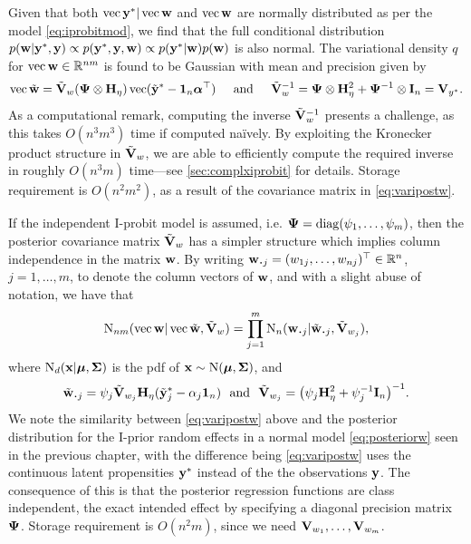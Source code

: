 Given that both $\operatorname{vec} {\mathbf y}^* | \operatorname{vec} {\mathbf w}$ and $\operatorname{vec}{\mathbf w}$ are normally distributed as per the model \cref{eq:iprobitmod}, we find that the full conditional distribution $p({\mathbf w}|{\mathbf y}^*,{\mathbf y}) \propto p({\mathbf y}^*,{\mathbf y},{\mathbf w}) \propto p({\mathbf y}^*|{\mathbf w})p({\mathbf w})$ is also normal. 
The variational density $q$ for $\operatorname{vec} {\mathbf w} \in \mathbb{R}^{nm}$ is found to be Gaussian with mean and precision given by
\begingroup
\setlength{\abovedisplayskip}{10pt}
\setlength{\belowdisplayskip}{4pt}
\begin{gather}\label{eq:varipostw}
   \operatorname{vec} \tilde{{\mathbf w}} = \tilde{{\mathbf V}}_w 
    ({\bm\Psi} \otimes {\mathbf H}_\eta) \operatorname{vec} (\tilde{{\mathbf y}}^* - {\mathbf 1}_n{\bm\alpha}^\top)
  \hspace{0.5cm}\text{and}\hspace{0.5cm} 
  \tilde {{\mathbf V}}_w^{-1} = {\bm\Psi} \otimes {\mathbf H}_\eta^2 + {\bm\Psi}^{-1} \otimes {\mathbf I}_n = {\mathbf V}_{y^*}.
\end{gather}
\endgroup
As a computational remark, computing the inverse $\tilde{{\mathbf V}}_w^{-1}$ presents a challenge, as this takes $O(n^3m^3)$ time if computed naïvely. 
By exploiting the Kronecker product structure in $\tilde{{\mathbf V}}_w$, we are able to efficiently compute the required inverse in roughly $O(n^3m)$ time---see \cref{sec:complxiprobit} for details.
Storage requirement is $O(n^2m^2)$, as a result of the covariance matrix in \cref{eq:varipostw}.

If the independent I-probit model is assumed, i.e. ${\bm\Psi} = \operatorname{diag}(\psi_1,\dots,\psi_m)$, then the posterior covariance matrix $\tilde{{\mathbf V}}_w$ has a simpler structure which implies column independence in the matrix ${\mathbf w}$.
By writing $\bw_{\bigcdot j} = (w_{1j},\dots,w_{nj})^\top \in \bbR^n$, $j=1,\dots,m$, to denote the column vectors of ${\mathbf w}$, and with a slight abuse of notation, we have that
\begingroup
\setlength{\abovedisplayskip}{5pt}
\setlength{\belowdisplayskip}{6pt}
\[
  \N_{nm}(\vecc \bw|\vecc\wtilde, \tilde\bV_w) 
  = \prod_{j=1}^m \N_{n}(\bw_{\bigcdot j}|\tilde\bw_{\bigcdot j}, \tilde\bV_{w_j}),
\]
\endgroup
where $\operatorname{N}_{d}({\mathbf x}|{\bm\mu},{\bm\Sigma})$ is the pdf of ${\mathbf x} \sim \operatorname{N}({\bm\mu},{\bm\Sigma})$, and
\begingroup
\setlength{\abovedisplayskip}{5pt}
\setlength{\belowdisplayskip}{0pt}
\[
  \tilde \bw_{\bigcdot j} = \psi_j\tilde \bV_{w_j}\bH_\eta (\tilde\by^*_j - \alpha_j\bone_n) \ \text{ and } \ \tilde \bV_{w_j} = \big(\psi_j\bH_{\eta}^2 + \psi_j^{-1}\bI_n \big)^{-1}.
\]
\endgroup
We note the similarity between \cref{eq:varipostw} above and the posterior distribution for the I-prior random effects in a normal model \cref{eq:posteriorw} seen in the previous chapter, with the difference being \cref{eq:varipostw} uses the continuous latent propensities ${\mathbf y}^*$ instead of the the observations ${\mathbf y}$.
The consequence of this is that the posterior regression functions are class independent, the exact intended effect by specifying a diagonal precision matrix ${\bm\Psi}$.
Storage requirement is $O(n^2m)$, since we need ${\mathbf V}_{w_1},\dots,{\mathbf V}_{w_m}$.

